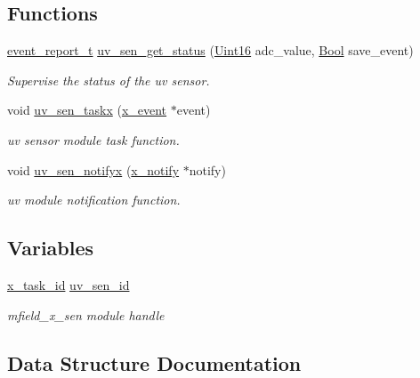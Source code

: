 \subsection*{Functions}
\begin{DoxyCompactItemize}
\item 
\hyperlink{a00021_d6/d66/a00441}{event\+\_\+report\+\_\+t} \hyperlink{a00020_a354d25047e79397dbe5525178f19cae0}{uv\+\_\+sen\+\_\+get\+\_\+status} (\hyperlink{a00072_a59a9f6be4562c327cbfb4f7e8e18f08b}{Uint16} adc\+\_\+value, \hyperlink{a00072_a253b248072cfc8bd812c69acd0046eed}{Bool} save\+\_\+event)
\begin{DoxyCompactList}\small\item\em Supervise the status of the uv sensor. \end{DoxyCompactList}\item 
void \hyperlink{a00020_ab4e931568892f0b46a2571d3c480f5c8}{uv\+\_\+sen\+\_\+taskx} (\hyperlink{a00036_de/d37/a00849}{x\+\_\+event} $\ast$event)
\begin{DoxyCompactList}\small\item\em uv sensor module task function. \end{DoxyCompactList}\item 
void \hyperlink{a00020_ae2617634df4d3055161f7fb1f148f6da}{uv\+\_\+sen\+\_\+notifyx} (\hyperlink{a00036_df/d4c/a00851}{x\+\_\+notify} $\ast$notify)
\begin{DoxyCompactList}\small\item\em uv module notification function. \end{DoxyCompactList}\end{DoxyCompactItemize}
\subsection*{Variables}
\begin{DoxyCompactItemize}
\item 
\hyperlink{a00036_ad5c3c5fbfd3e4aadf22830395484a71d}{x\+\_\+task\+\_\+id} \hyperlink{a00020_afd789f3f9ea182d28d4f16db0d8d5652}{uv\+\_\+sen\+\_\+id}
\begin{DoxyCompactList}\small\item\em mfield\+\_\+x\+\_\+sen module handle \end{DoxyCompactList}\end{DoxyCompactItemize}


\subsection{Data Structure Documentation}
\label{dd/d6d/a00111}
\hypertarget{a00020_dd/d6d/a00111}{}
